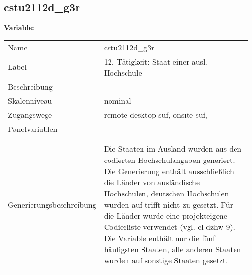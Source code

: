 	
	
	\subsection{cstu2112d\_g3r}
	\label{subSection:cstu2112d_g3r}

	\noindent\textbf{Variable:}\\
		\begin{tabular}{lL{11.3cm}}
			\label{tableVariable:cstu2112d_g3r}
			Name & cstu2112d\_g3r \\
			Label & 12. Tätigkeit: Staat einer ausl. Hochschule \\
			Beschreibung & - \\
			Skalenniveau & nominal \\
			Zugangswege &
				remote-desktop-suf,
				onsite-suf,
 \\
			Panelvariablen & -
			 \\
			 \\
 \\
					Generierungsbeschreibung & Die Staaten im Ausland wurden aus den codierten Hochschulangaben generiert. Die Generierung enthält ausschließlich die Länder von ausländische Hochschulen, deutschen Hochschulen wurden auf trifft nicht zu gesetzt. Für die Länder wurde eine projekteigene Codierliste verwendet (vgl. cl-dzhw-9). Die Variable enthält nur die fünf häufigsten Staaten, alle anderen Staaten wurden auf sonstige Staaten gesetzt. 
				 \\	
			 \\
		\end{tabular}







